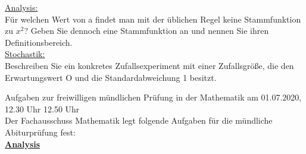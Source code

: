 \documentclass[a4paper,12pt]{article}
\begin{document}
\underline{Analysis:}\\
Für welchen Wert von a findet man mit der üblichen Regel keine Stammfunktion zu $x^2$? Geben Sie dennoch eine Stammfunktion an und nennen Sie ihren Definitionsbereich.\\

\underline{Stochastik:}\\
Beschreiben Sie ein konkretes Zufallsexperiment mit einer Zufallsgröße, die den Erwartungswert O und die Standardabweichung 1 besitzt.


\newpage

Aufgaben zur freiwilligen mündlichen Prüfung in der Mathematik am 01.07.2020, 12.30 Uhr 12.50 Uhr\\

Der Fachausschuss Mathematik legt folgende Aufgaben für die mündliche Abiturprüfung fest:\\

\underline{\textbf{Analysis}}\\
\end{document}
